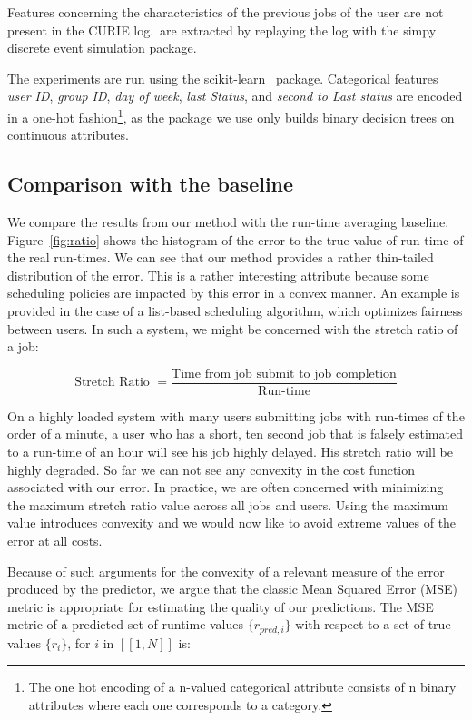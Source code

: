 \documentclass{article}
\begin{document}
  Features concerning the characteristics of the previous jobs of the user are not present in the CURIE log.\ are extracted by replaying the log with the simpy~\cite{simpy} discrete event simulation package.

  The experiments are run using the scikit-learn~\cite{scikit-learn} package. Categorical features \textit{user ID}, \textit{group ID}, \textit{day of week}, \textit{last Status}, and \textit{second to Last status} are encoded in a one-hot fashion\footnote{The one hot encoding of a n-valued categorical attribute consists of n binary attributes where each one corresponds to a category.}, as the package we use only builds binary decision trees on continuous attributes.

  \subsection{Comparison with the baseline}
  \label{sub:comparison_with_average_baseline}
  We compare the results from our method with the run-time averaging baseline.
  Figure~\ref{fig:ratio} shows the histogram of the error to the true value of run-time of the real run-times.
  We can see that our method provides a rather thin-tailed distribution of the error.
  This is a rather interesting attribute because some scheduling policies are impacted by this error in a convex manner.
  An example is provided in the case of a list-based scheduling algorithm, which optimizes fairness between users. In such a system, we might be concerned with the stretch ratio of a job:

  \[
    \mbox{Stretch Ratio } = \frac{\mbox{Time from job submit to job completion}}{\mbox{Run-time}}
  \]

  On a highly loaded system with many users submitting jobs with run-times of the order of a minute, a user who has a short, ten second job that is falsely estimated to a run-time of an hour will see his job highly delayed. His stretch ratio will be highly degraded.
  So far we can not see any convexity in the cost function associated with our error. In practice, we are often concerned with minimizing the maximum stretch ratio value across all jobs and users. Using the maximum value introduces convexity and we would now like to avoid extreme values of the error at all costs.

  Because of such arguments for the convexity of a relevant measure of the error produced by the predictor, we argue that the classic Mean Squared Error (MSE) metric is appropriate for estimating the quality of our predictions. The MSE metric of a predicted set of runtime values $\{r_{pred,i}\}$ with respect to a set of true values $\{r_{i}\}$, for $i$ in $[\![ 1,N]\!]$ is:
\end{document}
